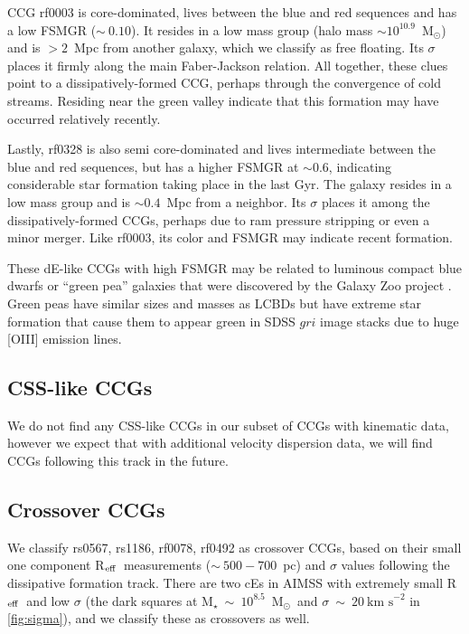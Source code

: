 \documentclass[iop,apj]{emulateapj}
\newcommand{\Reff}{R$_{\rm eff}$}
\newcommand{\Msun}{M$_{\odot}$}
\begin{document}
CCG rf0003 is core-dominated, lives between the blue and red sequences and has a low FSMGR ($\sim~0.10$). It resides in a low mass group (halo mass $\sim10^{10.9}$~\Msun) and is $>2$~Mpc from another galaxy, which we classify as free floating. Its $\sigma$ places it firmly along the main Faber-Jackson relation. All together, these clues point to a dissipatively-formed CCG, perhaps through the convergence of cold streams. Residing near the green valley indicate that this formation may have occurred relatively recently.

Lastly, rf0328 is also semi core-dominated and lives intermediate between the blue and red sequences, but has a higher FSMGR at $\sim0.6$, indicating considerable star formation taking place in the last Gyr. The galaxy resides in a low mass group and is $\sim0.4$~Mpc from a neighbor. Its $\sigma$ places it among the dissipatively-formed CCGs, perhaps due to ram pressure stripping or even a minor merger. Like rf0003, its color and FSMGR may indicate recent formation.

These dE-like CCGs with high FSMGR may be related to luminous compact blue dwarfs \citep[LCBDs;][]{Lisker2013, Crawford2016a} or ``green pea'' galaxies that were discovered by the Galaxy Zoo project \citep{Cardamone2009}. Green peas have similar sizes and masses as LCBDs but have extreme star formation that cause them to appear green in SDSS $gri$ image stacks due to huge [OIII] emission lines. 

\subsection{CSS-like CCGs}
We do not find any CSS-like CCGs in our subset of CCGs with kinematic data, however we expect that with additional velocity dispersion data, we will find CCGs following this track in the future.

\subsection{Crossover CCGs}
We classify rs0567, rs1186, rf0078, rf0492 as crossover CCGs, based on their small one component \Reff\ measurements ($\sim~500-700$~pc) and $\sigma$ values following the dissipative formation track. There are two cEs in AIMSS with extremely small \Reff\ and low $\sigma$ (the dark squares at M$_{\star}~\sim~10^{8.5}$~\Msun\ and $\sigma~\sim~20~\text{km~s}^{-2}$ in \autoref{fig:sigma}), and we classify these as crossovers as well.
\end{document}
